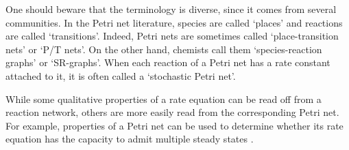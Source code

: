 \documentclass{compositionalityarticle}
\theoremstyle{compositionality}
\theoremstyle{remark}
\begin{document}
One should beware that the terminology is diverse, since it comes from several communities.  In the Petri net literature, species are called `places' and reactions are called `transitions'.  Indeed, Petri nets are sometimes called `place-transition nets' or `P/T nets'.  On the other hand, chemists call them `species-reaction graphs' or `SR-graphs'.   When each reaction of a Petri net has a rate constant attached to it, it is often called a `stochastic Petri net'.

While some qualitative properties of a rate equation can be read off from a reaction network, others are more easily read from the corresponding Petri net.  For example, properties of a Petri net can be used to determine whether its rate equation has the capacity to admit multiple steady states \cite{BanajiCraciun,CraciunFeinbergTang, FeinbergShinar}.  
\end{document}
